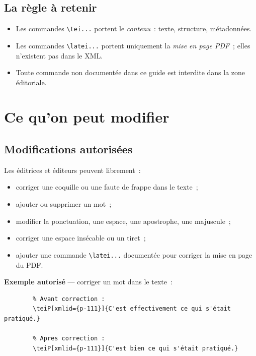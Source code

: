 \documentclass[11pt,a4paper]{article}
\newcommand{\cmd}[1]{\texttt{\textbackslash #1}}
\begin{document}
	\subsection{La règle à retenir}
	
	\begin{itemize}
		\item Les commandes \cmd{tei...} portent le \emph{contenu}~: texte,
		structure, métadonnées.
		\item Les commandes \cmd{latei...} portent uniquement la \emph{mise en
			page PDF}~; elles n'existent pas dans le XML.
		\item Toute commande non documentée dans ce guide est interdite dans la
		zone éditoriale.
	\end{itemize}
	
	\section{Ce qu'on peut modifier}
	
	\subsection{Modifications autorisées}
	
	Les éditrices et éditeurs peuvent librement~:
	
	\begin{itemize}
		\item corriger une coquille ou une faute de frappe dans le texte~;
		\item ajouter ou supprimer un mot~;
		\item modifier la ponctuation, une espace, une apostrophe, une
		majuscule~;
		\item corriger une espace insécable ou un tiret~;
		\item ajouter une commande \cmd{latei...} documentée pour corriger la
		mise en page du PDF.
	\end{itemize}
	
	\textbf{Exemple autorisé} — corriger un mot dans le texte~:
	
	\begin{lstlisting}
		% Avant correction :
		\teiP[xmlid={p-111}]{C'est effectivement ce qui s'était pratiqué.}
		
		% Apres correction :
		\teiP[xmlid={p-111}]{C'est bien ce qui s'était pratiqué.}
	\end{lstlisting}
	
\end{document}

